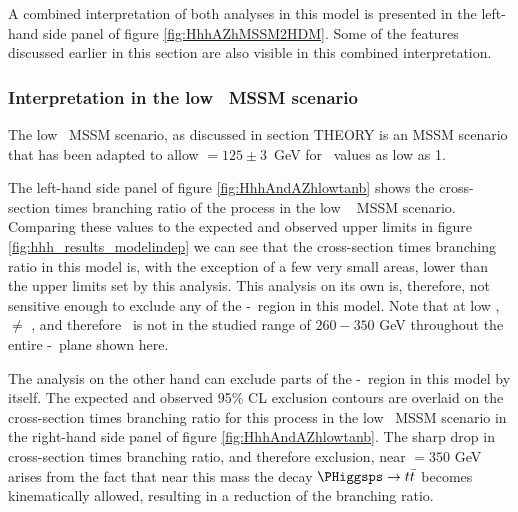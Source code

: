 A combined interpretation of both analyses in this model is presented
in the left-hand side panel of figure \ref{fig:HhhAZhMSSM2HDM}. Some of the features discussed earlier
in this section are also visible in this combined interpretation.


\subsubsection{Interpretation in the low \tanb~MSSM scenario}
\label{sec:hhh_results_modeldep_lowtb}
The low \tanb~MSSM scenario, as discussed in section THEORY
is an MSSM scenario that has been adapted to allow \mh $=125 \pm 3$~GeV for \tanb~values
as low as 1.  

The left-hand side panel of figure \ref{fig:HhhAndAZhlowtanb} shows the cross-section times branching ratio
of the \Htohhtobbtautau process in the low \tanb~ MSSM scenario. Comparing these values 
to the expected and observed upper limits in figure \ref{fig:hhh_results_modelindep} we 
can see that the cross-section times branching ratio in this model is, with the exception of a few very small 
areas, lower than the upper limits set by this analysis. This analysis on its own is,
therefore, not sensitive enough to exclude any of the \mA-\tanb~region in this model. Note that
at low \tanb, \mA$\neq$ \mH, and therefore \mH~is not in the studied range of $260-350$ GeV
throughout the entire \mA-\tanb~plane shown here.

The \AtoZhtolltautau analysis on the other hand can exclude parts of the \mA-\tanb~region
in this model by itself. The expected and observed 95\% CL exclusion contours are overlaid 
on the cross-section times branching ratio for this process in the low \tanb~MSSM scenario in the right-hand side panel 
of figure \ref{fig:HhhAndAZhlowtanb}. The sharp drop in cross-section times branching ratio, and therefore exclusion,
near \mA $ = 350$ GeV arises from the fact that near this mass the decay $\PHiggsps \rightarrow t\bar{t}$ becomes
kinematically allowed, resulting in a reduction of the \AtoZh branching ratio.


